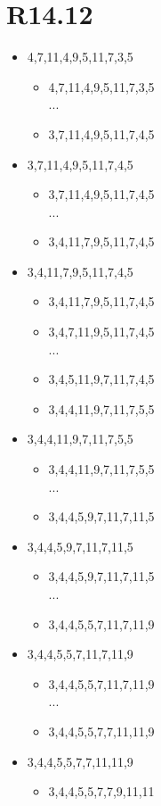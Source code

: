 \documentclass{article}
\begin{document}
\section{R14.12}
\begin{itemize}
 \item 4,7,11,4,9,5,11,7,3,5
       \begin{itemize}
        \item 4,7,11,4,9,5,11,7,3,5\\
              ...
        \item 3,7,11,4,9,5,11,7,4,5
       \end{itemize}
 \item 3,7,11,4,9,5,11,7,4,5
       \begin{itemize}
        \item 3,7,11,4,9,5,11,7,4,5\\
              ...
        \item 3,4,11,7,9,5,11,7,4,5
       \end{itemize}
 \item 3,4,11,7,9,5,11,7,4,5
       \begin{itemize}
        \item 3,4,11,7,9,5,11,7,4,5
        \item 3,4,7,11,9,5,11,7,4,5\\
              ...
        \item 3,4,5,11,9,7,11,7,4,5
        \item 3,4,4,11,9,7,11,7,5,5
       \end{itemize}
 \item 3,4,4,11,9,7,11,7,5,5
       \begin{itemize}
        \item 3,4,4,11,9,7,11,7,5,5\\
              ...
        \item 3,4,4,5,9,7,11,7,11,5
       \end{itemize}
 \item 3,4,4,5,9,7,11,7,11,5
       \begin{itemize}
        \item 3,4,4,5,9,7,11,7,11,5\\
              ...
        \item 3,4,4,5,5,7,11,7,11,9
       \end{itemize}
 \item 3,4,4,5,5,7,11,7,11,9
       \begin{itemize}
        \item 3,4,4,5,5,7,11,7,11,9\\
              ...
        \item 3,4,4,5,5,7,7,11,11,9
       \end{itemize}
 \item 3,4,4,5,5,7,7,11,11,9
       \begin{itemize}
        \item  3,4,4,5,5,7,7,9,11,11
       \end{itemize}
\end{itemize}
\end{document}
